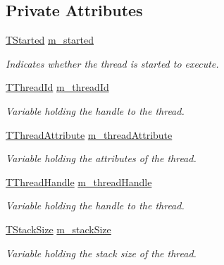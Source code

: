 \subsection*{Private Attributes}
\begin{DoxyCompactItemize}
\item 
\hyperlink{class_thread_base_ad8b410e3bc7320addea3c5b56ff6c985}{T\-Started} \hyperlink{class_thread_base_a5e2958ae98b989268d1e2be629789d64}{m\-\_\-started}
\begin{DoxyCompactList}\small\item\em Indicates whether the thread is started to execute. \end{DoxyCompactList}\item 
\hyperlink{class_thread_base_af8ec97aa7d89f9a4605a1c6c60777d5d}{T\-Thread\-Id} \hyperlink{class_thread_base_ae8574271bdcbfd80cbdde64c77bc7148}{m\-\_\-thread\-Id}
\begin{DoxyCompactList}\small\item\em Variable holding the handle to the thread. \end{DoxyCompactList}\item 
\hyperlink{class_thread_base_adea5ffdf2c74b95dbfee5148248f93b8}{T\-Thread\-Attribute} \hyperlink{class_thread_base_ad0d98c6f93707aef346cc66d8de78729}{m\-\_\-thread\-Attribute}
\begin{DoxyCompactList}\small\item\em Variable holding the attributes of the thread. \end{DoxyCompactList}\item 
\hyperlink{class_thread_base_ad87b599650c2062b6ff7e54934da7e2b}{T\-Thread\-Handle} \hyperlink{class_thread_base_a4f279b94eef423109969f69fadd9e674}{m\-\_\-thread\-Handle}
\begin{DoxyCompactList}\small\item\em Variable holding the handle to the thread. \end{DoxyCompactList}\item 
\hyperlink{class_thread_base_af45bd74387b409e15989f7eddbaf3718}{T\-Stack\-Size} \hyperlink{class_thread_base_a9c8b3446d099074f0f1608e5246e137d}{m\-\_\-stack\-Size}
\begin{DoxyCompactList}\small\item\em Variable holding the stack size of the thread. \end{DoxyCompactList}\end{DoxyCompactItemize}
